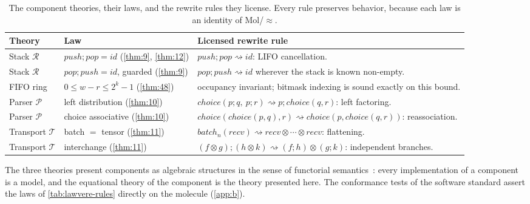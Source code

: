 \begin{table}[htbp]
\centering
\small
\caption{The component theories, their laws, and the rewrite rules they
license. Every rule preserves behavior, because each law is an identity of
Mol/$\approx$.}
\label{tab:lawvere-rules}
\begin{tabular}{@{}llp{6.5cm}@{}}
\toprule
Theory & Law & Licensed rewrite rule\\
\midrule
Stack $\mathcal{R}$ & $\mathit{push};\mathit{pop} = \mathit{id}$
(\ref{thm:9}, \ref{thm:12}) & $\mathit{push};\mathit{pop} \rightsquigarrow
\mathit{id}$: LIFO cancellation.\\
Stack $\mathcal{R}$ & $\mathit{pop};\mathit{push} = \mathit{id}$, guarded
(\ref{thm:9}) & $\mathit{pop};\mathit{push} \rightsquigarrow
\mathit{id}$ wherever the stack is known non-empty.\\
FIFO ring & $0 \leq w-r \leq 2^{k}-1$ (\ref{thm:48}) & occupancy invariant;
bitmask indexing is sound exactly on this bound.\\
Parser $\mathcal{P}$ & left distribution (\ref{thm:10}) &
$\mathit{choice} (p;q,\ p;r) \rightsquigarrow p;\mathit{choice} (q,r)$:
left factoring.\\
Parser $\mathcal{P}$ & choice associative (\ref{thm:10}) &
$\mathit{choice} (\mathit{choice} (p,q),r) \rightsquigarrow
\mathit{choice} (p,\mathit{choice} (q,r))$: reassociation.\\
Transport $\mathcal{T}$ & batch $=$ tensor (\ref{thm:11}) &
$\mathit{batch}_{n} (\mathit{recv}) \rightsquigarrow
\mathit{recv} \otimes \cdots \otimes \mathit{recv}$: flattening.\\
Transport $\mathcal{T}$ & interchange (\ref{thm:11}) &
$(f \otimes g);(h \otimes k) \rightsquigarrow (f;h) \otimes (g;k)$:
independent branches.\\
\bottomrule
\end{tabular}
\end{table}

\begin{remark}
The three theories present components as algebraic structures in the sense
of functorial semantics~\cite{lawvere, arxiv-lawvere}: every implementation
of a component is a model, and the equational theory of the component is
the theory presented here. The conformance tests of the software standard
assert the laws of \autoref{tab:lawvere-rules} directly on the molecule
(\autoref{app:b}).
\end{remark}
